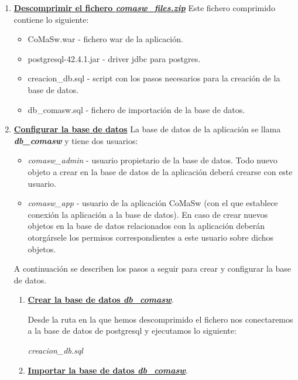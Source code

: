 \begin{enumerate}
\item \underline{\textbf{Descomprimir el fichero \emph{comasw\_files.zip}}} \newline
Este fichero comprimido contiene lo siguiente:
	\begin{itemize}
		\item CoMaSw.war - fichero war de la aplicación.
		\item postgresql-42.4.1.jar - driver jdbc para postgres.
		\item creacion\_db.sql - script con los pasos necesarios para la creación de la base de datos.
		\item db\_comasw.sql - fichero de importación de la base de datos.
	\end{itemize}

\item \underline{\textbf{Configurar la base de datos}}\newline
La base de datos de la aplicación se llama \emph{\textbf{db\_comasw}} y tiene dos usuarios:
	\begin{itemize}
		\item \emph{comasw\_admin} - usuario propietario de la base de datos. Todo nuevo objeto a crear en la base de datos de la aplicación deberá crearse con este usuario.
		\item \emph{comasw\_app} - usuario de la aplicación CoMaSw (con el que establece conexión la aplicación a la base de datos). En caso de crear nuevos objetos en la base de datos relacionados con la aplicación deberán otorgársele los permisos correspondientes a este usuario sobre dichos objetos.
	\end{itemize}
A continuación se describen los pasos a seguir para crear y configurar la base de datos.	
	\begin{enumerate}
		\item \underline{\textbf{Crear la base de datos \emph{\textbf{db\_comasw}}}}.\newline

Desde la ruta en la que hemos descomprimido el fichero nos conectaremos a la base de datos de postgresql y ejecutamos lo siguiente:\newline

\emph{creacion\_db.sql}\newline

	\item \underline{\textbf{Importar la base de datos \emph{\textbf{db\_comasw}}}}.\newline


\end{enumerate}
\end{enumerate}
